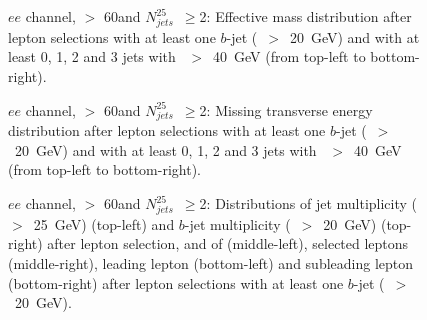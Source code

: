 \begin{figure}[h!]
\centering
{}
\caption{$ee$ channel, \met $>$ 60\GeV and $N_{jets}^{25}$~$\ge$2: Effective mass distribution after lepton selections with at least one $b$-jet (\pt~$>$~20~GeV) and with at least 0, 1, 2 and 3 jets with \pt~$>$~40~GeV (from top-left to bottom-right).}
\label{Fig:VP_ee_1b_Meff}
\end{figure}
\begin{figure}[h!]
\centering
{}
\caption{$ee$ channel, \met $>$ 60\GeV and $N_{jets}^{25}$~$\ge$2: Missing transverse energy distribution after lepton selections with at least one $b$-jet (\pt~$>$~20~GeV) and with at least 0, 1, 2 and 3 jets with \pt~$>$~40~GeV (from top-left to bottom-right).}
\label{Fig:VP_ee_1b_Met}
\end{figure}
\begin{figure}[h!]
\centering
{}
\caption{$ee$ channel, \met $>$ 60\GeV and $N_{jets}^{25}$~$\ge$2: Distributions of  jet multiplicity (\pt~$>$~25~GeV) (top-left) and $b$-jet multiplicity (\pt~$>$~20~GeV) (top-right) after lepton selection, and of \mt (middle-left), selected leptons \pt (middle-right), leading lepton \pt (bottom-left) and subleading lepton \pt (bottom-right) after lepton selections with at least one $b$-jet (\pt~$>$~20~GeV).}
\label{Fig:VP_ee_1b_Njets_and_other}
\end{figure} 




